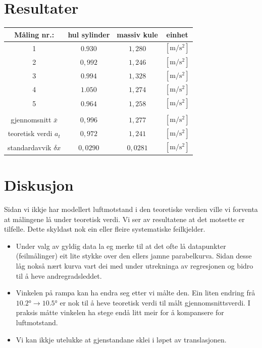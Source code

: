 \documentclass[12pt,a4paper]{article}
\begin{document}
  \section{Resultater}
  \begin{center}
    \begin{tabular}{|c|c|c|c|}
      \hline
      Måling nr.: & hul sylinder & massiv kule  & einhet\\
      \hline
      1 &  $0.930$  &  $1,280$  &  $[\si{\meter}/\si{\second}^2]$\\
      \hline
      2 &  $0,992$  &  $1,246$  &  $[\si{\meter}/\si{\second}^2]$\\
      \hline
      3 &  $0.994$  &  $1,328$  &  $[\si{\meter}/\si{\second}^2]$\\
      \hline
      4 &  $1.050$  &  $1,274$  &  $[\si{\meter}/\si{\second}^2]$\\
      \hline
      5 &  $0.964$  &  $1,258$  &  $[\si{\meter}/\si{\second}^2]$\\
      \hline
       & & & \\
      \hline
      gjennomsnitt $\bar{x}$  &  $0,996$  &  $1,277$ &     $[\si{\meter}/\si{\second}^2]$\\
      \hline
      teoretisk verdi $a_{t}$  &  $0,972$  &  $1,241$ &    $[\si{\meter}/\si{\second}^2]$\\
      \hline
      standardavvik $\delta x$  &  $0,0290$  &  $0,0281$ & $[\si{\meter}/\si{\second}^2]$\\
      \hline
    \end{tabular}
  \end{center}

  \section{Diskusjon}
  Sidan vi ikkje har modellert luftmotstand i den teoretiske verdien ville vi
  forventa at målingene lå under teoretisk verdi. Vi ser av resultatene at det
  motsette er tilfelle. Dette skyldast nok ein eller fleire systematiske feilkjelder.
  \begin{itemize}
    \item Under valg av gyldig data la eg merke til at det ofte lå datapunkter
      (feilmålinger) eit lite stykke over den ellers jamne parabelkurva. Sidan
      desse låg nokså nært kurva vart dei med under utrekninga av regresjonen
      og bidro til å heve andregradsleddet.
    \item Vinkelen på rampa kan ha endra seg etter vi målte den. Ein liten endring
      frå $\ang{10.2} \rightarrow \ang{10.5}$ er nok til å heve teoretisk verdi til
      målt gjennomsnittsverdi. I praksis måtte vinkelen ha stege endå litt meir for å
      kompansere for luftmotstand.
    \item Vi kan ikkje utelukke at gjenstandane sklei i løpet av translasjonen.
  \end{itemize}
\end{document}
